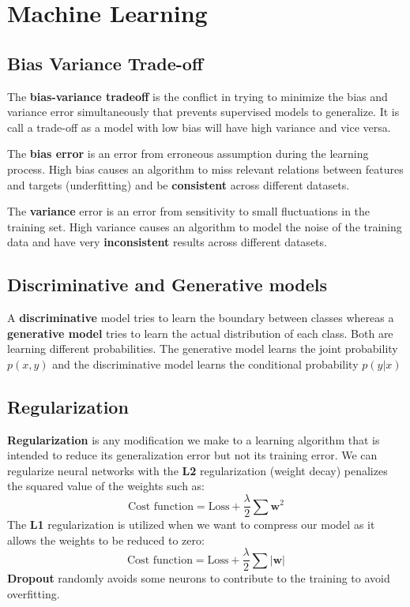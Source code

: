 \documentclass[12pt]{report}
\begin{document}
\chapter{Machine Learning}
    \section{Bias Variance Trade-off}
        The \textbf{bias-variance tradeoff} is the conflict in trying to minimize the bias and variance error simultaneously that prevents supervised models to generalize.
        It is call a trade-off as a model with low bias will have high variance and vice versa.
        
        The \textbf{bias error} is an error from erroneous assumption during the learning process. High bias causes an algorithm to miss relevant relations between features and targets  (underfitting) and be \textbf{consistent} across different datasets.
        
        The \textbf{variance} error is an error from sensitivity to small fluctuations in the training set. High variance causes an algorithm to model the noise of the training data and have very \textbf{inconsistent} results across different datasets.
    
    \section{Discriminative and Generative models}
        A \textbf{discriminative} model tries to learn the boundary between classes whereas a \textbf{generative model} tries to learn the actual distribution of each class.
        Both are learning different probabilities. The generative model learns the joint probability $p(x, y)$ and the discriminative model learns the conditional probability $p(y|x)$
        
    \section{Regularization}
        \textbf{Regularization} is any modification we make to a learning algorithm that is intended to reduce its generalization error but not its training error.
        We can regularize neural networks with the \textbf{L2} regularization (weight decay) penalizes the squared value of the weights such as:
        \begin{equation}
            \text{Cost function} = \text{Loss} + \frac{\lambda}{2} \sum \boldsymbol{w}^2
        \end{equation}
        The \textbf{L1} regularization is utilized when we want to compress our model as it allows the weights to be reduced to zero:
        \begin{equation}
            \text{Cost function} = \text{Loss} + \frac{\lambda}{2} \sum |\boldsymbol{w}|
        \end{equation}
        \textbf{Dropout} randomly avoids some neurons to contribute to the training to avoid overfitting.
\end{document}
